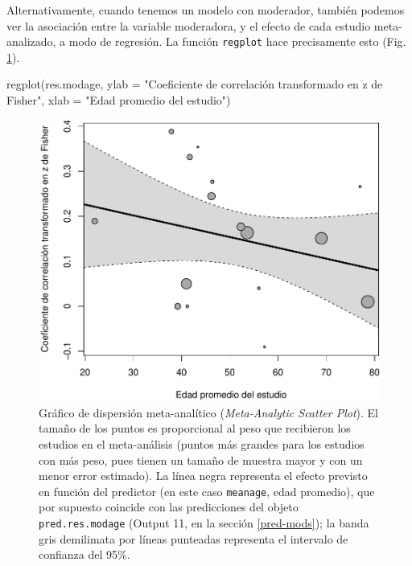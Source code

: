 \documentclass[
  bookmarksnumbered]{article}
\newenvironment{Shaded}{\begin{snugshade}}{\end{snugshade}}
\newcommand{\AttributeTok}[1]{\textcolor[rgb]{0.00,0.34,0.68}{#1}}
\newcommand{\FunctionTok}[1]{\textcolor[rgb]{0.39,0.29,0.61}{#1}}
\newcommand{\NormalTok}[1]{\textcolor[rgb]{0.12,0.11,0.11}{#1}}
\newcommand{\StringTok}[1]{\textcolor[rgb]{0.75,0.01,0.01}{#1}}
\begin{document}
Alternativamente, cuando tenemos un modelo con moderador, también podemos ver la asociación entre la variable moderadora, y el efecto de cada estudio meta-analizado, a modo de regresión. La función \texttt{regplot} hace precisamente esto (Fig. \ref{fig:reg-plot1}).

\begin{Shaded}
\begin{Highlighting}[]
\FunctionTok{regplot}\NormalTok{(res.modage,}
        \AttributeTok{ylab =} \StringTok{"Coeficiente de correlación transformado en z de Fisher"}\NormalTok{,}
        \AttributeTok{xlab =} \StringTok{"Edad promedio del estudio"}\NormalTok{)}
\end{Highlighting}
\end{Shaded}

\begin{figure}
\centering
\includegraphics{Meta-analysis_files/figure-latex/reg-plot1-1.pdf}
\caption{\label{fig:reg-plot1}Gráfico de dispersión meta-analítico (\emph{Meta-Analytic Scatter Plot}). El tamaño de los puntos es proporcional al peso que recibieron los estudios en el meta-análisis (puntos más grandes para los estudios con más peso, pues tienen un tamaño de muestra mayor y con un menor error estimado). La línea negra representa el efecto previsto en función del predictor (en este caso \texttt{meanage}, edad promedio), que por supuesto coincide con las predicciones del objeto \texttt{pred.res.modage} (Output 11, en la sección \ref{pred-mods}); la banda gris demilimata por líneas punteadas representa el intervalo de confianza del 95\%.}
\end{figure}
\end{document}
